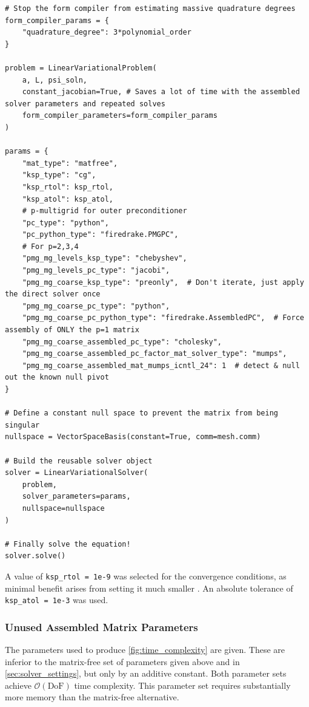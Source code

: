 \documentclass{article}
\begin{document}
\begin{appendices}
\begin{verbatim}
# Stop the form compiler from estimating massive quadrature degrees
form_compiler_params = {
    "quadrature_degree": 3*polynomial_order
}

problem = LinearVariationalProblem(
    a, L, psi_soln,
    constant_jacobian=True, # Saves a lot of time with the assembled solver parameters and repeated solves
    form_compiler_parameters=form_compiler_params
)

params = {
    "mat_type": "matfree",
    "ksp_type": "cg",
    "ksp_rtol": ksp_rtol,
    "ksp_atol": ksp_atol,
    # p-multigrid for outer preconditioner
    "pc_type": "python",
    "pc_python_type": "firedrake.PMGPC",
    # For p=2,3,4
    "pmg_mg_levels_ksp_type": "chebyshev",
    "pmg_mg_levels_pc_type": "jacobi",
    "pmg_mg_coarse_ksp_type": "preonly",  # Don't iterate, just apply the direct solver once
    "pmg_mg_coarse_pc_type": "python",
    "pmg_mg_coarse_pc_python_type": "firedrake.AssembledPC",  # Force assembly of ONLY the p=1 matrix
    "pmg_mg_coarse_assembled_pc_type": "cholesky",
    "pmg_mg_coarse_assembled_pc_factor_mat_solver_type": "mumps",
    "pmg_mg_coarse_assembled_mat_mumps_icntl_24": 1  # detect & null out the known null pivot
}

# Define a constant null space to prevent the matrix from being singular
nullspace = VectorSpaceBasis(constant=True, comm=mesh.comm)

# Build the reusable solver object
solver = LinearVariationalSolver(
    problem,
    solver_parameters=params,
    nullspace=nullspace
)

# Finally solve the equation!
solver.solve()
\end{verbatim}

A value of \texttt{ksp_rtol = 1e-9} was selected for the convergence conditions, as minimal benefit arises from setting it much smaller \cite{FiredrakeUserManual}.
An absolute tolerance of \texttt{ksp_atol = 1e-3} was used.

\subsubsection{Unused Assembled Matrix Parameters}\label{app:assembled_params}

The parameters used to produce \cref{fig:time_complexity} are given.
These are inferior to the matrix-free set of parameters given above and in \cref{sec:solver_settings}, but only by an additive constant.
Both parameter sets achieve $\mathcal{O}(\text{DoF})$ time complexity.
This parameter set requires substantially more memory than the matrix-free alternative.


\end{appendices}
\end{document}
